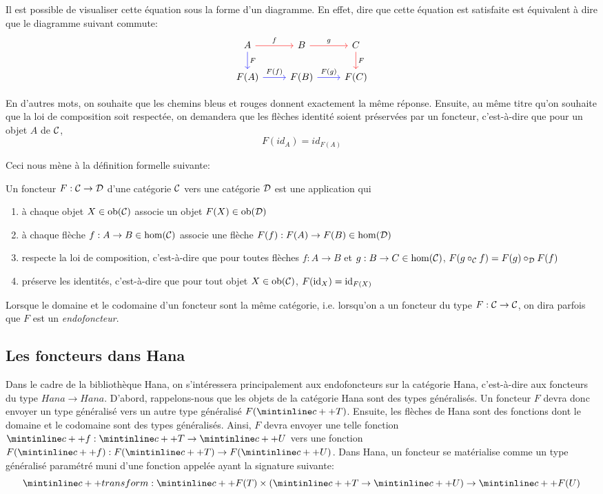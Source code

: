 Il est possible de visualiser cette équation sous la forme d'un diagramme.
En effet, dire que cette équation est satisfaite est équivalent à dire que
le diagramme suivant commute:
\[
\begin{tikzcd}
    A \arrow[r, red, "f" black] \arrow[d, blue, "F" black] & B \arrow[r, red, "g" black] & C \arrow[d, red, "F" black] \\
    F(A) \arrow[r, blue, "F(f)" black] & F(B) \arrow[r, blue, "F(g)" black] & F(C)
\end{tikzcd}
\]

En d'autres mots, on souhaite que les chemins bleus et rouges donnent
exactement la même réponse. Ensuite, au même titre qu'on souhaite que la loi
de composition soit respectée, on demandera que les flèches identité soient
préservées par un foncteur, c'est-à-dire que pour un objet $A$ de $\mathcal{C}$,
\[
    F(id_A) = id_{F(A)}
\]

Ceci nous mène à la définition formelle suivante:

\begin{définition}[Foncteur]
    Un foncteur $F : \mathcal{C} \to \mathcal{D}$ d'une catégorie $\mathcal{C}$ vers une catégorie $\mathcal{D}$
    est une application qui
    \begin{enumerate}
        \item à chaque objet $X \in \mathrm{ob}(\mathcal{C})$ associe un objet $F(X) \in \mathrm{ob}(\mathcal{D})$
        \item à chaque flèche $f : A \to B \in \hom(\mathcal{C})$ associe une flèche
              $F(f) : F(A) \to F(B) \in \hom(\mathcal{D})$
        \item respecte la loi de composition, c'est-à-dire que pour toutes
              flèches $f : A \to B$ et $g : B \to C \in \hom(\mathcal{C})$,
              $F(g \circ_{\mathcal{C}} f) = F(g) \circ_{\mathcal{D}} F(f)$
        \item préserve les identités, c'est-à-dire que pour tout objet
              $X \in \mathrm{ob}(\mathcal{C})$, $F(\mathrm{id}_X) = \mathrm{id}_{F(X)}$
    \end{enumerate}
\end{définition}

Lorsque le domaine et le codomaine d'un foncteur sont la même catégorie, i.e.
lorsqu'on a un foncteur du type $F : \mathcal{C} \to \mathcal{C}$, on dira parfois que $F$ est
un \textit{endofoncteur}.


\subsection{Les foncteurs dans Hana}
Dans le cadre de la bibliothèque Hana, on s'intéressera principalement aux
endofoncteurs sur la catégorie Hana, c'est-à-dire aux foncteurs du type
$Hana \to Hana$. D'abord, rappelons-nous que les objets de la catégorie
Hana sont des types généralisés. Un foncteur $F$ devra donc envoyer un type
généralisé  vers un autre type généralisé $F(\cc{T})$. Ensuite, les
flèches de Hana sont des fonctions dont le domaine et le codomaine sont des
types généralisés. Ainsi, $F$ devra envoyer une telle fonction
$\cc{f} : \cc{T} \to \cc{U}$ vers une fonction $F(\cc{f}) : F(\cc{T}) \to F(\cc{U})$.
Dans Hana, un foncteur se matérialise comme un type généralisé paramétré muni
d'une fonction appelée  ayant la signature suivante:
\[
    \cc{transform} : \cc{F(T)} \times (\cc{T} \to \cc{U}) \to \cc{F(U)}
\]

